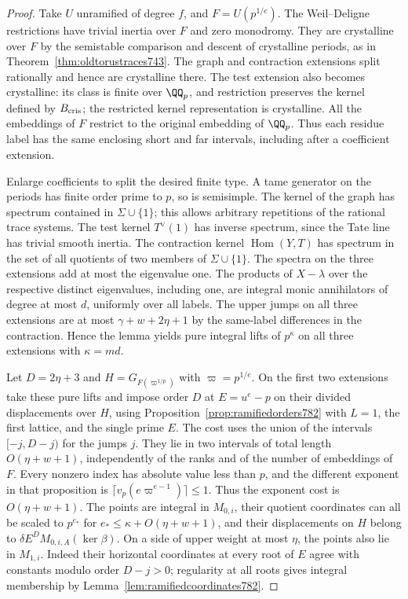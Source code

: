 \documentclass[a4paper,11pt]{article}
\theoremstyle{definition}
\theoremstyle{remark}
\numberwithin{equation}{section}
\begin{document}
\begin{proof}
Take \(U\) unramified of degree \(f\), and \(F=U(p^{1/e})\).
The Weil--Deligne restrictions have trivial inertia over
\(F\) and zero monodromy. They are crystalline over \(F\)
by the semistable comparison and descent of crystalline
periods, as in Theorem~\ref{thm:oldtorustraces743}.
The graph and contraction extensions split rationally
and hence are crystalline there. The test extension
also becomes crystalline: its class is finite over
\(\QQ_p\), and restriction preserves the kernel defined
by \(B_{\rm cris}\); the restricted kernel representation
is crystalline. All the embeddings of \(F\) restrict to
the original embedding of \(\QQ_p\). Thus each residue
label has the same enclosing short and far intervals,
including after a coefficient extension.

Enlarge coefficients to split the desired finite type.
A tame generator on the periods has finite order prime
to \(p\), so is semisimple. The kernel of the graph
has spectrum contained in \(\Sigma\cup\{1\}\); this
allows arbitrary repetitions of the rational trace
systems. The test kernel \(T^\vee(1)\) has inverse
spectrum, since the Tate line has trivial smooth inertia.
The contraction kernel \(\operatorname{Hom}(Y,T)\) has
spectrum in the set of all quotients of two members of
\(\Sigma\cup\{1\}\). The spectra on the three extensions
add at most the eigenvalue one. The products of \(X-\lambda\)
over the respective distinct eigenvalues, including one,
are integral monic annihilators of degree at most \(d\),
uniformly over all labels. The upper jumps on all three
extensions are at most \(\gamma+w+2\eta+1\) by the
same-label differences in the contraction. Hence the
lemma yields pure integral lifts of \(p^\kappa\) on all
three extensions with \(\kappa=md\).

Let \(D=2\eta+3\) and \(H=G_{F(\varpi^{1/p})}\) with
\(\varpi=p^{1/e}\). On the first two extensions take these
pure lifts and impose order \(D\) at \(E=u^e-p\) on their
divided displacements over \(H\), using
Proposition~\ref{prop:ramifiedorders782} with \(L=1\),
the first lattice, and the single prime \(E\).
The cost uses the union of the intervals \([-j,D-j)\)
for the jumps \(j\). They lie in two intervals of total
length \(O(\eta+w+1)\), independently of the ranks and of
the number of embeddings of \(F\). Every nonzero index
has absolute value less than \(p\), and the different
exponent in that proposition is
\(\lceil v_p(e\varpi^{e-1})\rceil\le1\). Thus the
exponent cost is \(O(\eta+w+1)\). The points are integral
in \(M_{0,i}\), their quotient coordinates can all be
scaled to \(p^{e_*}\) for
\(e_*\le\kappa+O(\eta+w+1)\), and their displacements
on \(H\) belong to \(\delta E^D M_{0,i,A}(\ker\beta)\).
On a side of upper weight at most \(\eta\), the points
also lie in \(M_{1,i}\). Indeed their horizontal coordinates
at every root of \(E\) agree with constants modulo
order \(D-j>0\); regularity at all roots gives integral
membership by Lemma~\ref{lem:ramifiedcoordinates782}.


\end{proof}
\end{document}
